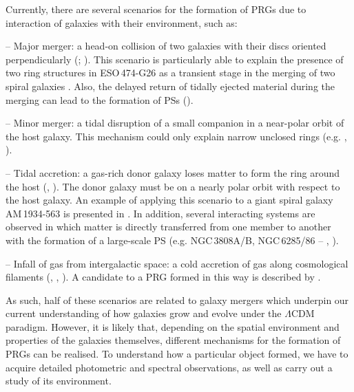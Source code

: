 \documentclass{raa}
\begin{document}
Currently, there are several scenarios for the formation of PRGs due to 
interaction of galaxies with their environment, such as:

-- Major merger: a head-on collision of two galaxies with their discs oriented
perpendicularly (\citealt{bekki1997,bekki1998}; \citealt{bourcomb2003}).
This scenario is particularly able to explain the presence of two 
ring structures in ESO\,474-G26 as a transient stage in the merging of two 
spiral galaxies \citep{rbc2005}. Also, the delayed return of tidally ejected
material during the merging can lead to the formation of PSs 
(\citealt{hib1995}).

-- Minor merger: a tidal disruption of a small companion in a near-polar orbit
of the host galaxy. This mechanism could only explain narrow unclosed 
rings (e.g. \citealt{john2001}, \citealt{rbc2006}).

-- Tidal accretion: a gas-rich donor galaxy loses matter to form the ring
around the host (\citealt{rs1997}, \citealt{bourcomb2003}). The donor
galaxy must be on a nearly polar orbit with respect to the 
host galaxy. An example of applying this scenario to a giant spiral 
galaxy AM\,1934-563 is presented in \cite{rbc2006}. 
In addition, several interacting systems are observed in which matter is 
directly transferred from one member to another with the formation of a
large-scale PS (e.g. NGC\,3808A/B, NGC\,6285/86 --
\citealt{rhy1996}, \citealt{ord2016}).

-- Infall of gas from intergalactic space: a cold accretion of gas along 
cosmological filaments (\citealt{1996ApJ...461...55T,1998ApJ...506...93T}, \citealt{maccio2006}, \citealt{brook2008}).
A candidate to a PRG formed in this way is described by
\cite{stan2009}.

As such, half of these scenarios are related to galaxy mergers which underpin our current understanding of how galaxies grow and evolve under the $\Lambda$CDM paradigm.
However, it is likely that, depending on the spatial environment and properties of 
the galaxies themselves, different mechanisms for the formation of 
PRGs can be realised. To understand how a particular object formed, 
we have to acquire detailed photometric and spectral observations, as well as carry out a 
study of its environment.
\end{document}
